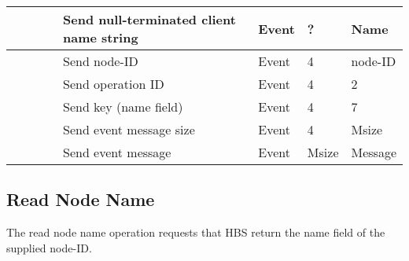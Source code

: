 \begin{tabular}{|p{1.2in}|p{.4in}|p{.4in}|p{.5in}|p{1.2in}|p{.4in}|p{.4in}|p{.5in} |}
                  &        &       &       & Send null-terminated client
                                             name string  & Event  &  ?    & Name  \\ \hline
                  &        &       &       & Send node-ID  & Event  &   4   &   node-ID    \\  \hline
                  &        &       &       & Send operation 
                                             ID           & Event  &   4   &  2   \\ \hline
                  &        &       &       & Send key (name field)    & Event  &   4   &  7    \\ \hline
                  &        &       &       & Send event message
                                                  size    & Event  &   4   &  Msize \\ \hline
                  &        &       &       & Send event message
                                                          & Event  & Msize& Message  \\ \hline
\end{tabular}
\normalsize
\bigskip




\newpage
\subsection{Read Node Name}

The read node name operation requests that HBS return the name field of
the supplied node-ID.



